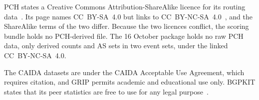 PCH states a Creative Commons Attribution-ShareAlike licence for its routing data~\cite{pch_mrt}.
Its page names CC~BY-SA~4.0 but links to CC~BY-NC-SA~4.0~\cite{cc_by_nc_sa_4}, and the ShareAlike terms of the two differ.
Because the two licences conflict, the scoring bundle holds no PCH-derived file.
The 16 October package holds no raw PCH data, only derived counts and AS sets in two event sets, under the linked CC~BY-NC-SA~4.0.

The CAIDA datasets are under the CAIDA Acceptable Use Agreement, which requires citation, and GRIP permits academic and educational use only.
BGPKIT states that its peer statistics are free to use for any legal purpose~\cite{bgpkit}.

